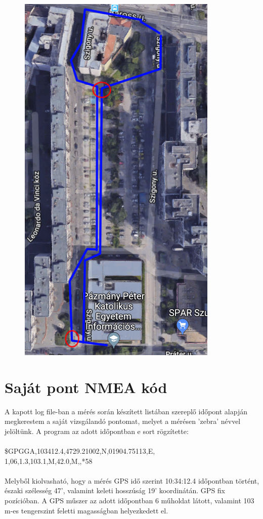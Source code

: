 \documentclass[10pt, conference,a4paper]{ITKproc}
\begin{document}
\begin{figure}[h]
\includegraphics[scale=0.4]{utvonal_googlemaps}
\centering
\end{figure}



\section{Saját pont NMEA kód}
A kapott log file-ban a mérés során készített listában szereplő időpont alapján megkerestem a saját vizsgálandó pontomat, melyet a mérésen 'zebra' névvel jelöltünk. A program az adott időpontban e sort rögzítette:
\\ \\
\$GPGGA,103412.4,4729.21002,N,01904.75113,E,\\1,06,1.3,103.1,M,42.0,M,,*58\\
\\
Melyből kiolvasható, hogy a mérés GPS idő szerint 10:34:12.4 időpontban történt, északi szélesség 47', valamint keleti hosszúság 19' koordinátán. GPS fix pozícióban. A GPS műszer az adott időpontban 6 műholdat látott, valamint 103 m-es tengerszint feletti magasságban helyezkedett el. 
\end{document}
